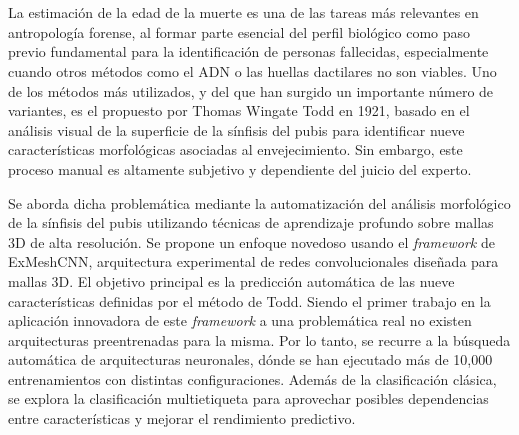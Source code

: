 \chapter*{}


%



\thispagestyle{empty}

\begin{center}
{\small \bfseries \myTitle}
\end{center}
\begin{center}
\myName
\end{center}



La estimación de la edad de la muerte es una de las tareas más relevantes en antropología forense, al formar parte esencial del perfil biológico como paso previo fundamental para la identificación de personas fallecidas, especialmente cuando otros métodos como el ADN o las huellas dactilares no son viables. Uno de los métodos más utilizados, y del que han surgido un importante número de variantes, es el propuesto por Thomas Wingate Todd en 1921, basado en el análisis visual de la superficie de la sínfisis del pubis para identificar nueve características morfológicas asociadas al envejecimiento. Sin embargo, este proceso manual es altamente subjetivo y dependiente del juicio del experto.

Se aborda dicha problemática mediante la automatización del análisis morfológico de la sínfisis del pubis utilizando técnicas de aprendizaje profundo sobre mallas 3D de alta resolución. Se propone un enfoque novedoso usando el \textit{framework} de ExMeshCNN, arquitectura experimental de redes convolucionales diseñada para mallas 3D. El objetivo principal es la predicción automática de las nueve características definidas por el método de Todd. Siendo el primer trabajo en la aplicación innovadora de este \textit{framework} a una problemática real no existen arquitecturas preentrenadas para la misma. Por lo tanto, se recurre a la búsqueda automática de arquitecturas neuronales, dónde se han ejecutado más de 10,000 entrenamientos con distintas configuraciones. Además de la clasificación clásica, se explora la clasificación multietiqueta para aprovechar posibles dependencias entre características y mejorar el rendimiento predictivo.

